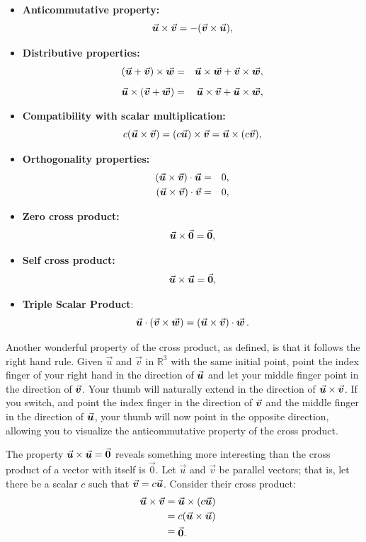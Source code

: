 \begin{itemize}
	\item   \textbf{Anticommutative property:}
	$$\crossp uv = -(\crossp vu),$$ 
	
	\item      \textbf{Distributive properties:}
	\begin{eqnarray*}
		 (\vec u+\vec v)\times \vecw &=& \crossp uw+\crossp vw,\\[0.2cm]
		\vec u \times (\vec v+\vec w) &=& \crossp uv+\crossp uw,
	\end{eqnarray*}
	
	\item		\textbf{Compatibility with scalar multiplication:}
	$$c(\crossp uv) = (c\vecu) \times \vec v = \vecu \times (c\vecv),$$
	
	\item       \textbf{Orthogonality properties:}
	\begin{eqnarray*}
		(\crossp uv)\cdot \vecu &=& 0,\\ 
		(\crossp uv)\cdot \vecv &=& 0,
	\end{eqnarray*}
	
	\item \textbf{Zero cross product:}
	$$\crossp u0 = \vec 0,$$
	    
	\item \textbf{Self cross product:}
	$$\crossp uu = \vec 0,$$
	
	\item		\textbf{Triple Scalar Product}:
	$$\vecu \cdot (\vecv\times\vecw) = (\crossp uv)\cdot \vecw \,.$$
\end{itemize}


Another wonderful property of the cross product, as defined, is that it follows the right hand rule. Given $\vec u$ and $\vec v$ in $\mathbb{R}^3$ with the same initial point, point the index finger of your right hand in the direction of $\vecu$ and let your middle finger point in the direction of $\vecv$. Your thumb will naturally extend in the direction of $\crossp uv$. If you switch, and point the index finger in the direction of $\vecv$ and the middle finger in the direction of $\vecu$, your thumb will now point in the opposite direction, allowing you to visualize the anticommutative property of the cross product.

The property $\crossp uu = \vec 0$ reveals something more interesting than the cross product of a vector with itself is $\vec 0$. Let $\vec u$ and $\vec v$ be parallel vectors; that is, let there be a scalar $c$ such that $\vecv = c\vecu$. Consider their cross product:
\begin{align*}
\crossp uv &= \vecu \times (c\vec u) \\
					&=	\parbox{50pt}{$c(\crossp uu)$}\\
					&= \parbox{50pt}{$\vec 0$.}
\end{align*}

